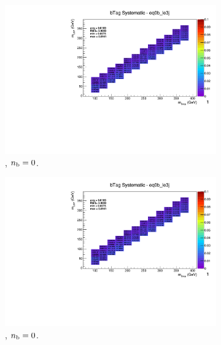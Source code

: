 \begin{figure}[ht!]
  \centering
  \begin{subfigure}[b]{0.32\textwidth}
    \includegraphics[width=\textwidth, page=14]{Figs/sms/t2degen/v19_3/systs/T2_4body_bTag_eq0b_le3j.pdf}
    \caption{\njlow, $n_{\text{b}} = 0$.}
  \end{subfigure}
  \begin{subfigure}[b]{0.32\textwidth}
    \includegraphics[width=\textwidth, page=9]{Figs/sms/t2degen/v19_3/systs/T2_4body_bTag_eq0b_le3j.pdf}
    \caption{\njlow, $n_{\text{b}} = 0$.}
  \end{subfigure}
  \begin{subfigure}[b]{0.32\textwidth}

\end{subfigure}
\end{figure}
